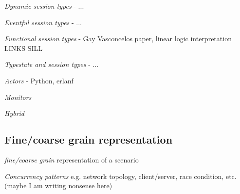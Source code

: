 {\em Dynamic session types} - ...

{\em Eventful session types} - ...

{\em Functional session types} - Gay Vasconcelos paper, linear logic interpretation LINKS SILL

{\em Typestate and session types} - ...

{\em Actors} - Python, erlanf

{\em Monitors}

{\em Hybrid}

\subsection{Fine/coarse grain representation}
{\em  fine/coarse grain} representation of a scenario

{\em Concurrency patterns} e.g. network topology, client/server, race condition, etc. (maybe I am writing nonsense here)


